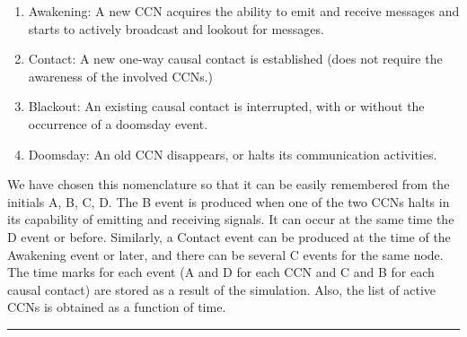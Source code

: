 \documentclass[crop]{CSLB}
\newcommand{\ceti}{CCN}
\newcommand{\cetis}{CCNs}
\newcommand{\blackout}{B event }
\newcommand{\doomsday}{D event }
\newcommand{\aawakening}{Awakening event }
\newcommand{\ccontact}{Contact event }
\newcommand{\contacts}{C events }
\begin{document}
\begin{enumerate}
   \item[(A)] Awakening: A new \ceti{} acquires the ability to emit
      and receive messages and starts to actively broadcast and
      lookout for messages.
   \item[(C)] Contact: A new one-way causal contact is established
      (does not require the awareness of the involved \cetis{}.)
   \item[(B)] Blackout: An existing causal contact is interrupted,
      with or without the occurrence of a doomsday event.
   \item[(D)] Doomsday: An old \ceti{} disappears, or halts its
      communication activities.
\end{enumerate}

We have chosen this nomenclature so that it can be easily remembered
from the initials A, B, C, D.
%
The \blackout is produced when one of the two \cetis{} halts in its
capability of emitting and receiving signals.
%
It can occur at the same time the \doomsday or before.
%
Similarly, a \ccontact can be produced at the time of the \aawakening
or later, and there can be several \contacts for the same node.
%
The time marks for each event (A and D for each \ceti{} and C and B
for each causal contact) are stored as a result of the simulation.
%
Also, the list of active \cetis{} is obtained as a function of time.
%



  



\rule{8cm}{12pt} \bigskip

        









%
\end{document}

